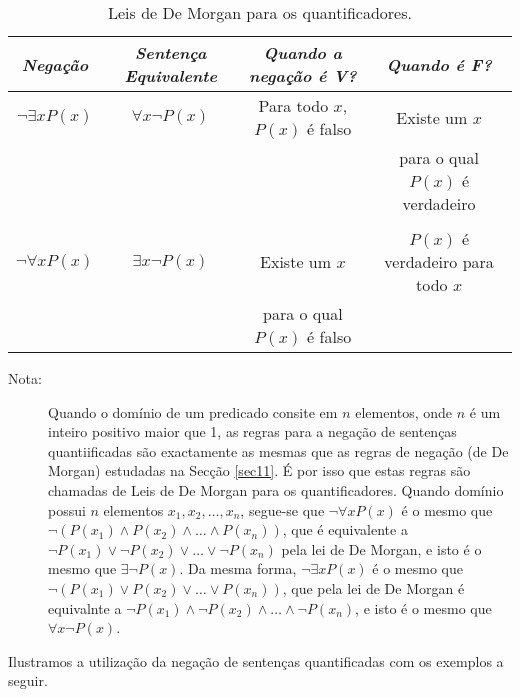 \begin{table}[H]
	\centering
	\scriptsize{
	\begin{tabular}{|c||c||c||c|}%
	\toprule
	\textbf{\emph{Negação}}&\textbf{\emph{Sentença
	Equivalente}}&\textbf{\emph{Quando a negação é V?}}&\textbf{\emph{Quando
	é F?}}\\
	\midrule
	$\lnot \exists xP(x)$ & $\forall x\lnot P(x)$ & Para todo $x$, $P(x)$ é falso &
	Existe um $x$ \\ & & & para o qual $P(x)$ é verdadeiro\\
	&&& \\
	
	$\lnot \forall xP(x)$ & $\exists x\lnot P(x)$ & Existe um $x$ & $P(x)$ é verdadeiro para todo $x$\\
	& & para o qual $P(x)$ é falso &\\
	\bottomrule%
	\end{tabular}%
	}
	\caption{Leis de De Morgan para os quantificadores.}
	\label{tab118}
\end{table}

\begin{description}
\item[Nota:] Quando o domínio de um predicado consite em $n$ elementos, onde $n$
é um inteiro positivo maior que 1, as regras para a negação de sentenças
quantiificadas são exactamente as mesmas que as regras de negação (de De Morgan)
estudadas na Secção \ref{sec11}. É por isso que estas regras são chamadas de
Leis de De Morgan para os quantificadores. Quando domínio possui $n$ elementos
$x_1, x_2, \ldots, x_n$, segue-se que $\lnot\forall xP(x)$ é o mesmo que
$\lnot(P(x_1) \land P(x_2) \land \ldots \land P(x_n))$, que é equivalente a
$\lnot P(x_1) \lor \lnot P(x_2) \lor \ldots \lor \lnot P(x_n)$ pela lei de De
Morgan, e isto é o mesmo que $\exists\lnot P(x)$. Da mesma forma, $\lnot\exists
xP(x)$ é o mesmo que $\lnot(P(x_1) \lor P(x_2) \lor \ldots \lor P(x_n))$, que
pela lei de De Morgan é equivalnte a $\lnot P(x_1) \land \lnot P(x_2) \land
\ldots \land \lnot P(x_n) $, e isto é o mesmo que $\forall x\lnot P(x)$.
\end{description}

Ilustramos a utilização da negação de sentenças quantificadas com os exemplos a
seguir.

